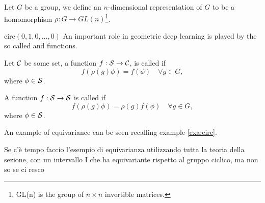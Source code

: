 \documentclass[../3.tex]{subfiles}
\begin{document}
    \begin{defn}
        Let $G$ be a group, we define an $n$-dimensional representation of $G$ to be a homomorphism $\rho : G \to GL(n)$\footnote{GL(n) is the group of $n \times n$ invertible matrices.}.
    \end{defn}
    $\text{circ}(0,1,0,\dots,0)$
    An important role in geometric deep learning is played by the so called  and  functions.

    \begin{defn}
        Let $\mathcal{C}$ be some set, a function $f : \mathcal{S} \to \mathcal{C}$, is called  if
        \[ f(\rho(g)\phi) = f(\phi) \quad \forall g \in G, \]
        where $\phi \in \mathcal{S}$.
   \end{defn}

   \begin{defn}
       A function $f : \mathcal{S} \to \mathcal{S}$ is called  if 
       \[ f(\rho(g)\phi) = \rho(g)f(\phi) \quad \forall g \in G, \]
       where $\phi \in \mathcal{S}$.
   \end{defn}

   An example of equivariance can be seen recalling example \ref{exa:circ}.

   {\color{red}
   \begin{exa}
        Se c'è tempo faccio l'esempio di equivarianza utilizzando tutta la teoria della sezione, con un intervallo I che ha 
        equivariante rispetto al gruppo ciclico, ma non so se ci resco
   \end{exa}
   }
\end{document}
